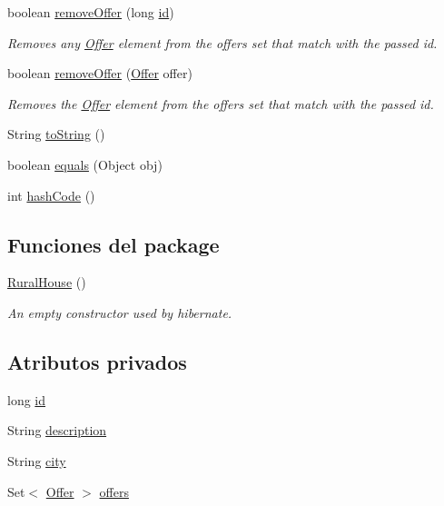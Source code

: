 \begin{DoxyCompactItemize}
boolean \mbox{\hyperlink{a00188_ab6443a7d5fdef35c6a04110d497ddb16}{remove\+Offer}} (long \mbox{\hyperlink{a00188_ad9352e84ead5c4feb7eadee60570d9de}{id}})
\begin{DoxyCompactList}\small\item\em Removes any \mbox{\hyperlink{a00184}{Offer}} element from the offers set that match with the passed id. \end{DoxyCompactList}\item 
boolean \mbox{\hyperlink{a00188_a36466194bda46f454c816aa5845c0d14}{remove\+Offer}} (\mbox{\hyperlink{a00184}{Offer}} offer)
\begin{DoxyCompactList}\small\item\em Removes the \mbox{\hyperlink{a00184}{Offer}} element from the offers set that match with the passed id. \end{DoxyCompactList}\item 
String \mbox{\hyperlink{a00188_a33c5888213bc3b3f5a4d3c0015f9d033}{to\+String}} ()
\item 
boolean \mbox{\hyperlink{a00188_affbd64026d988c58be52b7f7e5ebfbe8}{equals}} (Object obj)
\item 
int \mbox{\hyperlink{a00188_a12fcb2ec3f802b71b5a1357622255b86}{hash\+Code}} ()
\end{DoxyCompactItemize}
\subsection*{Funciones del \textquotesingle{}package\textquotesingle{}}
\begin{DoxyCompactItemize}
\item 
\mbox{\hyperlink{a00188_a6312a6b35355d7883853544db74662f8}{Rural\+House}} ()
\begin{DoxyCompactList}\small\item\em An empty constructor used by hibernate. \end{DoxyCompactList}\end{DoxyCompactItemize}
\subsection*{Atributos privados}
\begin{DoxyCompactItemize}
\item 
long \mbox{\hyperlink{a00188_ad9352e84ead5c4feb7eadee60570d9de}{id}}
\item 
String \mbox{\hyperlink{a00188_a3cd460d3df936008a7c7580e87680fd4}{description}}
\item 
String \mbox{\hyperlink{a00188_a495797ff9bd294c83563790e36ec2245}{city}}
\item 
Set$<$ \mbox{\hyperlink{a00184}{Offer}} $>$ \mbox{\hyperlink{a00188_a8e07bbd638166d5d9356828a4ce09488}{offers}}
\end{DoxyCompactItemize}
